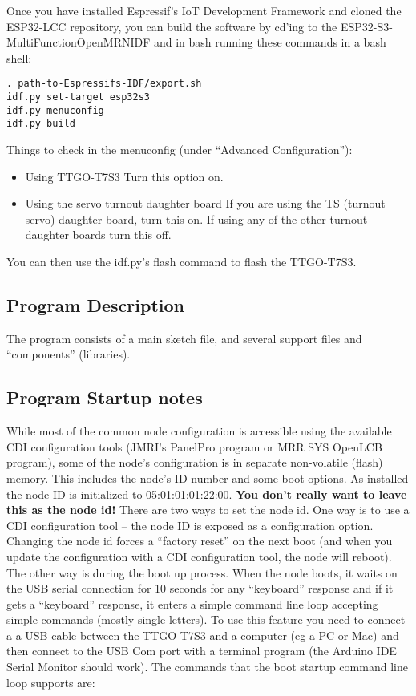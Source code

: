 Once you have installed Espressif's IoT Development Framework and cloned the
ESP32-LCC repository, you can build the software by cd'ing to the
ESP32-S3-MultiFunctionOpenMRNIDF and in bash running these commands in a bash
shell:

\begin{verbatim}
. path-to-Espressifs-IDF/export.sh
idf.py set-target esp32s3
idf.py menuconfig
idf.py build
\end{verbatim}

Things to check in the menuconfig (under ``Advanced Configuration''):

\begin{itemize}
\item{Using TTGO-T7S3} Turn this option on.
\item{Using the servo turnout daughter board} If you are using the TS (turnout 
servo) daughter board, turn this on.  If using any of the other turnout 
daughter boards turn this off.
\end{itemize}

You can then use the idf.py's flash command to flash the TTGO-T7S3.

\subsection{Program Description}

The program consists of a main sketch file, and several support files and
``components'' (libraries).

\subsection{Program Startup notes}

While most of the common node configuration is accessible using the available
CDI configuration tools (JMRI's PanelPro program or MRR SYS OpenLCB program),
some of the node's configuration is in separate non-volatile (flash) memory.
This includes the node's ID number and some boot options. As installed the
node ID is initialized to 05:01:01:01:22:00. \textbf{You don't really want to
leave this as the node id!} There are two ways to set the node id. One way is
to use a CDI configuration tool -- the node ID is exposed as a configuration
option. Changing the node id forces a ``factory reset'' on the next boot (and
when you update the configuration with a CDI configuration tool, the node
will reboot). The other way is during the boot up process. When the node
boots, it waits on the USB serial connection for 10 seconds for any
``keyboard'' response and if it gets a ``keyboard'' response, it enters a
simple command line loop accepting simple commands (mostly single letters). To
use this feature you need to connect a a USB cable between the TTGO-T7S3 and a
computer (eg a PC or Mac) and then connect to the USB Com port with a terminal
program (the Arduino IDE Serial Monitor should work). The commands that the
boot startup command line loop supports are:

